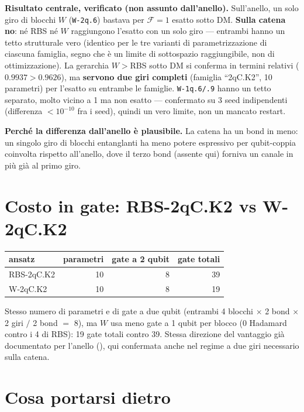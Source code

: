 \documentclass[11pt,a4paper]{article}
\begin{document}
\textbf{Risultato centrale, verificato (non assunto dall'anello).} Sull'anello, un
solo giro di blocchi $W$ (\texttt{W-2q.6}) bastava per $\mathcal F=1$ esatto sotto
DM. \textbf{Sulla catena no}: né RBS né $W$ raggiungono l'esatto con un solo giro —
entrambi hanno un tetto strutturale vero (identico per le tre varianti di
parametrizzazione di ciascuna famiglia, segno che è un limite di sottospazio
raggiungibile, non di ottimizzazione). La gerarchia $W>$RBS sotto DM si conferma in
termini relativi ($0.9937>0.9626$), ma \textbf{servono due giri completi} (famiglia
``2qC.K2'', 10 parametri) per l'esatto su entrambe le famiglie. \texttt{W-1q.6/.9}
hanno un tetto separato, molto vicino a 1 ma non esatto — confermato su 3 seed
indipendenti (differenza $<10^{-10}$ fra i seed), quindi un vero limite, non un
mancato restart.

\textbf{Perché la differenza dall'anello è plausibile.} La catena ha un bond in
meno: un singolo giro di blocchi entanglanti ha meno potere espressivo per
qubit-coppia coinvolta rispetto all'anello, dove il terzo bond (assente qui)
forniva un canale in più già al primo giro.

\section*{Costo in gate: RBS-2qC.K2 vs W-2qC.K2}

\begin{center}
\renewcommand{\arraystretch}{1.2}
\begin{tabular}{lrrr}
\toprule
ansatz & parametri & gate a 2 qubit & gate totali \\
\midrule
RBS-2qC.K2 & 10 & 8 & 39 \\
W-2qC.K2   & 10 & 8 & 19 \\
\bottomrule
\end{tabular}
\end{center}

Stesso numero di parametri e di gate a due qubit (entrambi 4 blocchi $\times$ 2
bond $\times$ 2 giri $/$ 2 bond $=$ 8), ma $W$ usa meno gate a 1 qubit per blocco (0
Hadamard contro i 4 di RBS): 19 gate totali contro 39. Stessa direzione del
vantaggio già documentato per l'anello (\texttt{}),
qui confermata anche nel regime a due giri necessario sulla catena.

\section*{Cosa portarsi dietro}
\end{document}
